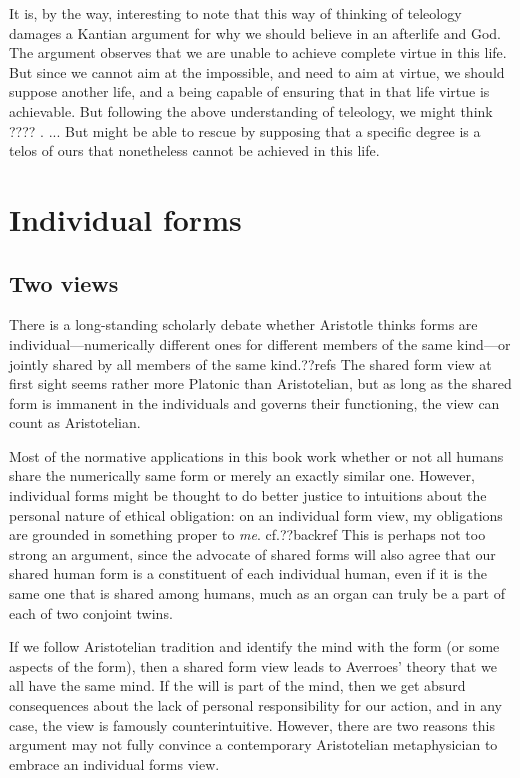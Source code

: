 It is, by the way, interesting to note that this way of thinking of teleology damages a Kantian argument for why we should believe in 
an afterlife and God. The argument observes that we are unable to achieve complete virtue in this life. But since we cannot aim at
the impossible, and need to aim at virtue, we should suppose another life, and a being capable of ensuring that in that life virtue
is achievable. But following the above understanding of teleology, we might think ???? . ... But might be able to rescue by supposing
that a specific degree is a telos of ours that nonetheless cannot be achieved in this life.

\section{Individual forms}
\subsection{Two views}
There is a long-standing scholarly debate whether Aristotle thinks forms are individual---numerically different ones for different members of 
the same kind---or jointly shared by all members of the same kind.??refs The shared form view at first sight seems rather 
more Platonic than Aristotelian, but as long as the shared form is immanent in the individuals and governs their functioning,
the view can count as Aristotelian. 

Most of the normative applications in this book work whether or not all humans share the numerically same form or merely 
an exactly similar one. However, individual forms might be thought to do better justice to intuitions about the personal 
nature of ethical obligation: on an individual form view, my obligations are grounded in something proper to \textit{me}. cf.??backref This is perhaps not too strong an argument, since the advocate of shared forms will also agree that our 
shared human form is a constituent of each individual human, even if it is the same one that is shared among humans, much 
as an organ can truly be a part of each of two conjoint twins. 

If we follow Aristotelian tradition and identify the mind with the form (or some aspects of the form), then a shared form 
view leads to Averroes' theory that we all have the same mind. If the will is part of the mind, then we get absurd consequences
about the lack of personal responsibility for our action, and in any case, the view is famously counterintuitive. However, 
there are two reasons this argument may not fully convince a contemporary Aristotelian metaphysician to embrace an individual
forms view. 

